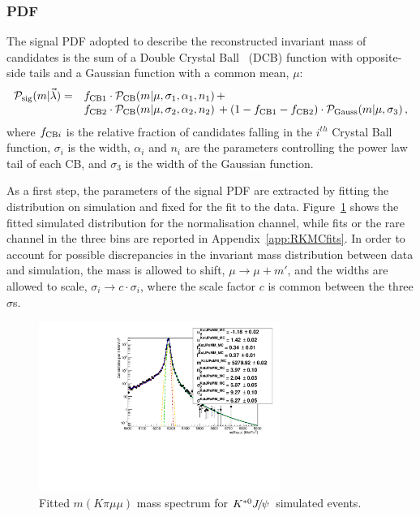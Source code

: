 \subsubsection{\BdToKstJPsmm PDF}

The signal PDF adopted to describe the reconstructed \mcKpimm invariant mass of \BdToKstJPsmm candidates is the 
sum of a Double Crystal Ball~\cite{Skwarnicki:1986xj} (DCB) function with opposite-side tails and a Gaussian function with 
a common mean, $\mu$:
%
\begin{equation*}
\begin{array}{rl}
\mathcal{P}_{\rm sig}(m | \vec{\lambda}) = & 
f_{\rm CB1} \cdot \mathcal{P}_{\rm CB}(m | \mu, \sigma_1, \alpha_1, n_1) \, + \\
& f_{\rm CB2} \cdot \mathcal{P}_{\rm CB}(m | \mu, \sigma_2, \alpha_2, n_2) \, 
+ (1 - f_{\rm CB1} -f_{\rm CB2}) \cdot \mathcal{P}_{\rm Gauss}(m | \mu, \sigma_3) \, ,
\end{array}
\end{equation*}
where $f_{{\rm CB}i}$ is the relative fraction of candidates falling in the $i^{th}$ Crystal Ball function, $\sigma_i$ is the width, $\alpha_i$ and $n_i$ are the parameters controlling the power law tail of each CB, and $\sigma_3$ is the width of the Gaussian function.

As a first step, the parameters of the signal PDF are extracted by fitting the \mcKpimm distribution 
on \BdToKstJPsmm simulation and fixed for the fit to the data.
Figure~\ref{fig:mumu_MC_fits} shows the fitted simulated distribution for the normalisation channel, while
fits or the rare channel in the three \qsq bins are reported in Appendix~\ref{app:RKMCfits}.
In order to account for possible discrepancies in the invariant mass distribution between data and simulation, the mass is allowed to shift, $\mu \rightarrow \mu +m'$, and the widths are allowed to scale, $\sigma_i \rightarrow c \cdot \sigma_i$, where 
the scale factor $c$ is common between the three $\sigma$s.
%
\begin{figure}[h!]
\centering \includegraphics[width=0.7\textwidth]{RKst/figs/Fit/fit_MM/KstJPsMM_MC_log.pdf}
\caption{Fitted $m(K\pi \mu\mu)$ mass spectrum for $\Kstarz\jpsi$ simulated events. }
\label{fig:mumu_MC_fits}
\end{figure}
%
%

